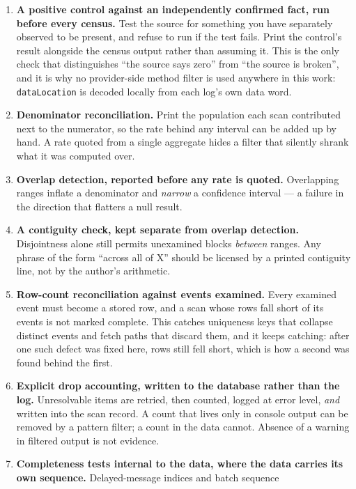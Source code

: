 \documentclass[conference]{IEEEtran}
\providecommand{\tightlist}{\setlength{\itemsep}{0pt}\setlength{\parskip}{0pt}}
\renewcommand{\_}{\textunderscore\allowbreak}
\begin{document}
\begin{enumerate}
\def\labelenumi{\arabic{enumi}.}
\tightlist
\item
  \textbf{A positive control against an independently confirmed fact,
  run before every census.} Test the source for something you have
  separately observed to be present, and refuse to run if the test
  fails. Print the control's result alongside the census output rather
  than assuming it. This is the only check that distinguishes ``the
  source says zero'' from ``the source is broken'', and it is why no
  provider-side method filter is used anywhere in this work:
  \texttt{dataLocation} is decoded locally from each log's own data
  word.
\item
  \textbf{Denominator reconciliation.} Print the population each scan
  contributed next to the numerator, so the rate behind any interval can
  be added up by hand. A rate quoted from a single aggregate hides a
  filter that silently shrank what it was computed over.
\item
  \textbf{Overlap detection, reported before any rate is quoted.}
  Overlapping ranges inflate a denominator and \emph{narrow} a
  confidence interval --- a failure in the direction that flatters a
  null result.
\item
  \textbf{A contiguity check, kept separate from overlap detection.}
  Disjointness alone still permits unexamined blocks \emph{between}
  ranges. Any phrase of the form ``across all of X'' should be licensed
  by a printed contiguity line, not by the author's arithmetic.
\item
  \textbf{Row-count reconciliation against events examined.} Every
  examined event must become a stored row, and a scan whose rows fall
  short of its events is not marked complete. This catches uniqueness
  keys that collapse distinct events and fetch paths that discard them,
  and it keeps catching: after one such defect was fixed here, rows
  still fell short, which is how a second was found behind the first.
\item
  \textbf{Explicit drop accounting, written to the database rather than
  the log.} Unresolvable items are retried, then counted, logged at
  error level, \emph{and} written into the scan record. A count that
  lives only in console output can be removed by a pattern filter; a
  count in the data cannot. Absence of a warning in filtered output is
  not evidence.
\item
  \textbf{Completeness tests internal to the data, where the data
  carries its own sequence.} Delayed-message indices and batch sequence

\end{enumerate}
\end{document}
